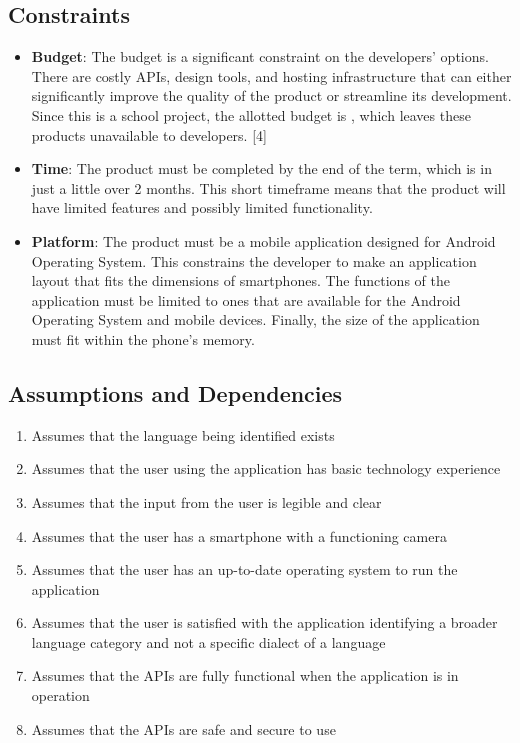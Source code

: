 
\subsection{Constraints}
\label{sub:constraints}
\begin{itemize}
	\item \textbf{Budget}: The budget is a significant constraint on the developers' options. There are costly APIs, design tools, and hosting infrastructure that can either significantly improve the quality of the product or streamline its development. Since this is a school project, the allotted budget is , which leaves these products unavailable to developers. [4]
	\item \textbf{Time}: The product must be completed by the end of the term, which is in just a little over 2 months. This short timeframe means that the product will have limited features and possibly limited functionality.
	\item \textbf{Platform}: The product must be a mobile application designed for Android Operating System. This constrains the developer to make an application layout that fits the dimensions of smartphones. The functions of the application must be limited to ones that are available for the Android Operating System and mobile devices. Finally, the size of the application must fit within the phone's memory.
\end{itemize}


\subsection{Assumptions and Dependencies}
\label{sub:assumptions_and_dependencies}
\begin{enumerate}[1.]
	\item Assumes that the language being identified exists
	\item Assumes that the user using the application has basic technology experience
	\item Assumes that the input from the user is legible and clear
	\item Assumes that the user has a smartphone with a functioning camera
	\item Assumes that the user has an up-to-date operating system to run the application
	\item Assumes that the user is satisfied with the application identifying a broader language category and not a specific dialect of a language
	\item Assumes that the APIs are fully functional when the application is in operation
	\item Assumes that the APIs are safe and secure to use
\end{enumerate}




